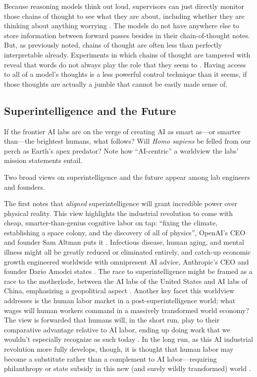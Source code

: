 Because reasoning models think out loud, supervisors can just directly monitor
those chains of thought to see what they are about, including whether they are
thinking about anything worrying \cite{baker2025monitoring}. The models do not
have anywhere else to store information between forward passes besides in their
chain-of-thought notes. But, as previously noted, chains of thought are often
less than perfectly interpretable already. Experiments in which chains of
thought are tampered with reveal that words do not always play the role that
they seem to \cite{turpin2023unfaithful,chen2025unfaithful}. Having access to
all of a model's thoughts is a less powerful control technique than it seems,
if those thoughts are actually a jumble that cannot be easily made sense of.

\subsection{Superintelligence and the Future}
If the frontier AI labs are on the verge of creating AI as smart as---or
smarter than---the brightest humans, what follows? Will \emph{Homo sapiens} be
felled from our perch as Earth's apex predator? Note how ``AI-centric'' a
worldview the labs' mission statements entail.

Two broad views on superintelligence and the future appear among lab engineers
and founders.

The first notes that \emph{aligned} superintelligence will grant incredible
power over physical reality. This view highlights the industrial revolution to
come with cheap, smarter-than-genius cognitive labor on tap: ``fixing the
climate, establishing a space colony, and the discovery of all of physics'',
OpenAI's CEO and founder Sam Altman puts it \cite{altman2024intelligence}.
Infectious disease, human aging, and mental illness might all be greatly
reduced or eliminated entirely, and catch-up economic growth engineered
worldwide with omnipresent AI advice, Anthropic's CEO and founder Dario Amodei
states \cite{amodei2024grace}. The race to superintelligence might be framed as
a race to the motherlode, between the AI labs of the United States and AI labs
of China, emphasizing a geopolitical aspect
\cite{aschenbrenner2024situational,amodei2024grace}. Another key facet this
worldview addresses is the human labor market in a post-superintelligence
world; what wages will human workers command in a massively transformed world
economy? The view is forwarded that humans will, in the short run, play to
their comparative advantage relative to AI labor, ending up doing work that we
wouldn't especially recognize as such today
\cite{altman2024intelligence,amodei2024grace}. In the long run, as this AI
industrial revolution more fully develops, though, it is thought that human
labor may become a substitute rather than a complement to AI labor---requiring
philanthropy or state subsidy in this new (and surely wildly transformed) world
\cite{amodei2024grace}.

